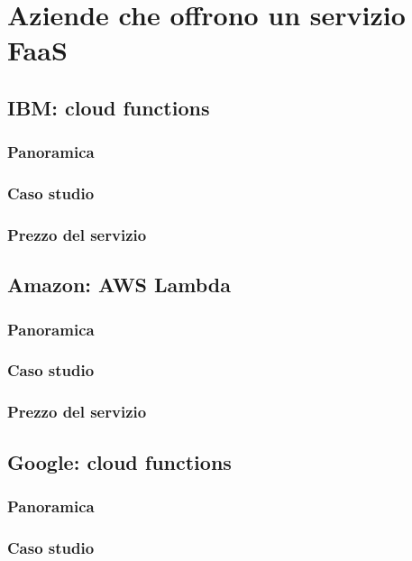\documentclass[a4paper]{article}
\begin{document}
	\section{Aziende che offrono un servizio FaaS}
	
	\subsection{IBM: cloud functions}
	
	\subsubsection{Panoramica}
	
	\subsubsection{Caso studio}
	
	\subsubsection{Prezzo del servizio}
	
	\subsection{Amazon: AWS Lambda}
	
	\subsubsection{Panoramica}
	
	\subsubsection{Caso studio}
	
	\subsubsection{Prezzo del servizio}
	
	\subsection{Google: cloud functions}
	
	\subsubsection{Panoramica}
	
	\subsubsection{Caso studio}
	
\end{document}

